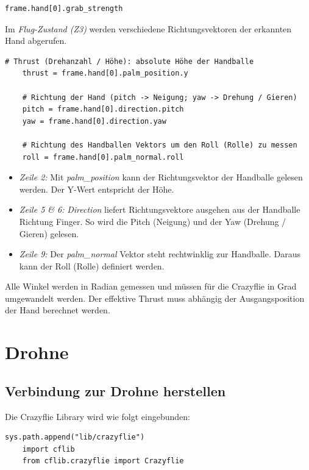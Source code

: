 \begin{lstlisting}[style=lstStyleCpp]
	frame.hand[0].grab_strength
\end{lstlisting}

Im \textit{Flug-Zustand (Z3)} werden verschiedene Richtungsvektoren der erkannten Hand abgerufen.

\begin{lstlisting}[style=lstStyleCpp]
	# Thrust (Drehanzahl / Höhe): absolute Höhe der Handballe
	thrust = frame.hand[0].palm_position.y
	
	# Richtung der Hand (pitch -> Neigung; yaw -> Drehung / Gieren)
	pitch = frame.hand[0].direction.pitch
	yaw = frame.hand[0].direction.yaw
	
	# Richtung des Handballen Vektors um den Roll (Rolle) zu messen
	roll = frame.hand[0].palm_normal.roll
\end{lstlisting}

\begin{itemize}
	\item \textit{Zeile 2:}
	Mit \textit{palm\_position} kann der Richtungsvektor der Handballe gelesen werden. Der Y-Wert entspricht der Höhe.
	
	\item \textit{Zeile 5 \& 6:}
	\textit{Direction} liefert Richtungsvektore ausgehen aus der Handballe Richtung Finger. So wird die Pitch (Neigung) und der Yaw (Drehung / Gieren) gelesen.
	
	\item \textit{Zeile 9:}
	Der \textit{palm\_normal} Vektor steht rechtwinklig zur Handballe. Daraus kann der Roll (Rolle) definiert werden.
\end{itemize}

Alle Winkel werden in Radian gemessen und müssen für die Crazyflie in Grad umgewandelt werden.
Der effektive Thrust muss abhängig der Ausgangsposition der Hand berechnet werden.


\section{Drohne}
\subsection{Verbindung zur Drohne herstellen}
Die Crazyflie Library wird wie folgt eingebunden:
\begin{lstlisting}[style=lstStyleCpp]
	sys.path.append("lib/crazyflie")
	import cflib
	from cflib.crazyflie import Crazyflie
\end{lstlisting}

